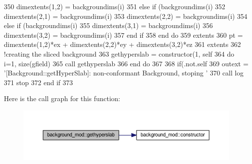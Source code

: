 \begin{DoxyCode}
350             dimextents(1,2) = backgroundims(i)%
351         \textcolor{keywordflow}{else} \textcolor{keywordflow}{if} (backgroundims(i)%
352             dimextents(2,1) = backgroundims(i)%
353             dimextents(2,2) = backgroundims(i)%
354         \textcolor{keywordflow}{else} \textcolor{keywordflow}{if} (backgroundims(i)%
355             dimextents(3,1) = backgroundims(i)%
356             dimextents(3,2) = backgroundims(i)%
357 \textcolor{keywordflow}{        end if}
358 \textcolor{keywordflow}{    end do}
359     extents%
360     pt = dimextents(1,2)*ex + dimextents(2,2)*ey + dimextents(3,2)*ez
361     extents%
362     \textcolor{comment}{!creating the sliced background}
363     gethyperslab = constructor(1, self%
364     \textcolor{keywordflow}{do} i=1, \textcolor{keyword}{size}(gfield)
365         \textcolor{keyword}{call }gethyperslab%
366 \textcolor{keywordflow}{    end do}
367 
368     \textcolor{keywordflow}{if}(.not.self%
369         outext = \textcolor{stringliteral}{'[Background::getHyperSlab]: non-conformant Background, stoping '}
370         \textcolor{keyword}{call }log%
371         stop
372 \textcolor{keywordflow}{    end if}
373 
\end{DoxyCode}
Here is the call graph for this function\+:\nopagebreak
\begin{figure}[H]
\begin{center}
\leavevmode
\includegraphics[width=350pt]{namespacebackground__mod_ae26fda3baab915148ec5749d1eda2ea6_cgraph}
\end{center}
\end{figure}
\mbox{\label{namespacebackground__mod_ac799224ce7ad219bf1fb4f1f42508f45}} 
